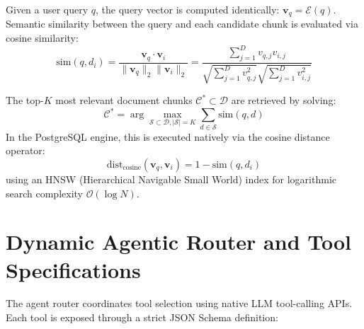 \documentclass[12pt,a4paper]{report}
\begin{document}
Given a user query $q$, the query vector is computed identically: $\mathbf{v}_q = \mathcal{E}(q)$. Semantic similarity between the query and each candidate chunk is evaluated via cosine similarity:
\begin{equation}
\text{sim}(q, d_i) = \frac{\mathbf{v}_q \cdot \mathbf{v}_i}{\|\mathbf{v}_q\|_2 \|\mathbf{v}_i\|_2} = \frac{\sum_{j=1}^D v_{q,j} v_{i,j}}{\sqrt{\sum_{j=1}^D v_{q,j}^2} \sqrt{\sum_{j=1}^D v_{i,j}^2}}
\end{equation}

The top-$K$ most relevant document chunks $\mathcal{C}^* \subset \mathcal{D}$ are retrieved by solving:
\begin{equation}
\mathcal{C}^* = \arg\max_{\mathcal{S} \subset \mathcal{D}, |\mathcal{S}| = K} \sum_{d \in \mathcal{S}} \text{sim}(q, d)
\end{equation}
In the PostgreSQL engine, this is executed natively via the cosine distance operator:
\begin{equation}
\text{dist}_{\text{cosine}}(\mathbf{v}_q, \mathbf{v}_i) = 1 - \text{sim}(q, d_i)
\end{equation}
using an HNSW (Hierarchical Navigable Small World) index for logarithmic search complexity $\mathcal{O}(\log N)$.

\section{Dynamic Agentic Router and Tool Specifications}
The agent router coordinates tool selection using native LLM tool-calling APIs. Each tool is exposed through a strict JSON Schema definition:
\end{document}
